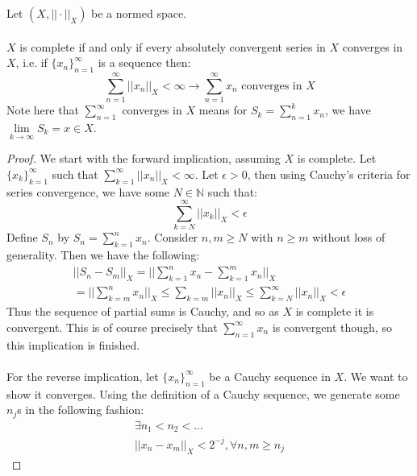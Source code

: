 \documentclass[12pt]{article}
\newcommand{\bignorm}{\Big | \Big |}
\newenvironment{theorem}[2][Theorem]{\begin{trivlist}
\item[\hskip \labelsep {\bfseries #1}\hskip \labelsep {\bfseries #2.}]}{\end{trivlist}}
\begin{document}
\begin{theorem}{(Completeness Characterization)}
    Let $(X, ||\cdot||_X)$ be a normed space. \\ \\
    $X$ is complete if and only if every absolutely convergent series in $X$ converges in $X$, i.e. if $\{x_n\}_{n = 1}^\infty$ is a sequence then:
    \begin{equation}
        \sum_{n = 1}^\infty ||x_n||_X < \infty \longrightarrow \sum_{n = 1}^\infty x_n \text{ converges in } X
    \end{equation}
    Note here that $\sum_{n = 1}^\infty$ converges in $X$ means for $S_k = \sum_{n = 1}^k x_n$, we have $\underset{k \rightarrow \infty}{\lim} S_k = x \in X$. 

\begin{proof}
    We start with the forward implication, assuming $X$ is complete. Let $\{x_k\}_{k = 1}^\infty$ such that $\sum_{k = 1}^\infty ||x_n||_X < \infty$. Let $\epsilon > 0$, then using Cauchy's criteria for series convergence, we have some $N \in \mathbb{N}$ such that:
    $$\sum_{k = N}^\infty ||x_k||_X < \epsilon$$
    Define $S_n$ by $S_n = \sum_{k = 1}^n x_n$. Consider $n, m \geq N$ with $n \geq m$ without loss of generality. Then we have the following:
    \begin{equation}
        \begin{aligned}
        ||S_n - S_m||_X = \bignorm \sum_{k = 1}^n x_n - \sum_{k = 1}^m x_n \bignorm_X \\
        = \bignorm \sum_{k = m}^n x_n \bignorm_X \leq \sum_{k = m} ||x_n||_X \leq \sum_{k = N}^\infty ||x_n||_X < \epsilon
        \end{aligned}
    \end{equation}
    Thus the sequence of partial sums is Cauchy, and so as $X$ is complete it is convergent. This is of course precisely that $\sum_{n = 1}^\infty x_n$ is convergent though, so this implication is finished. \\ \\
    For the reverse implication, let $\{x_n\}_{n = 1}^\infty$ be a Cauchy sequence in $X$. We want to show it converges. Using the definition of a Cauchy sequence, we generate some $n_j$s in the following fashion:
    \begin{equation}
        \begin{aligned}
            \exists n_1 < n_2 < ... \\
            ||x_n - x_m||_X < 2^{-j}, \forall n,m \geq n_j
        \end{aligned}

\end{equation}
\end{proof}
\end{theorem}
\end{document}
